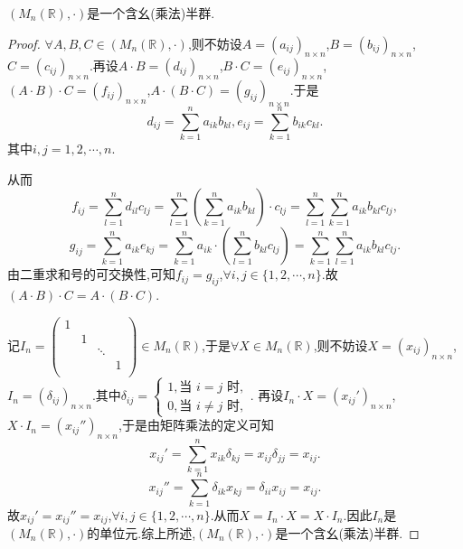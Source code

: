 \documentclass[../../main.tex]{subfiles}
\begin{document}
\begin{example}
$\left( M_n\left( \mathbb{R} \right) ,\cdot \right)$是一个含幺(乘法)半群.
\end{example}
\begin{proof}
\(\forall A,B,C\in (M_n(\mathbb{R}),\cdot)\),则不妨设\(A=(a_{ij})_{n\times n}\),\(B=(b_{ij})_{n\times n}\),\(C=(c_{ij})_{n\times n}\).再设\(A\cdot B=(d_{ij})_{n\times n}\),\(B\cdot C=(e_{ij})_{n\times n}\),\((A\cdot B)\cdot C=(f_{ij})_{n\times n}\),\(A\cdot (B\cdot C)=(g_{ij})_{n\times n}\).于是
\[
d_{ij}=\sum_{k = 1}^n{a_{ik}b_{kl}},e_{ij}=\sum_{k = 1}^n{b_{ik}c_{kl}}.
\]
其中\(i,j = 1,2,\cdots,n\).

从而
\[
f_{ij}=\sum_{l = 1}^n{d_{il}c_{lj}}=\sum_{l = 1}^n{\left(\sum_{k = 1}^n{a_{ik}b_{kl}}\right)\cdot c_{lj}}=\sum_{l = 1}^n{\sum_{k = 1}^n{a_{ik}b_{kl}c_{lj}}},
\]
\[
g_{ij}=\sum_{k = 1}^n{a_{ik}e_{kj}}=\sum_{k = 1}^n{a_{ik}\cdot\left(\sum_{l = 1}^n{b_{kl}c_{lj}}\right)}=\sum_{k = 1}^n{\sum_{l = 1}^n{a_{ik}b_{kl}c_{lj}}}.
\]
由二重求和号的可交换性,可知\(f_{ij}=g_{ij}\),\(\forall i,j\in \{1,2,\cdots,n\}\).故\((A\cdot B)\cdot C = A\cdot (B\cdot C)\).

记\(I_n=\begin{pmatrix}
1 & & & \\
& 1 & & \\
& & \ddots & \\
& & & 1\\
\end{pmatrix}\in M_n(\mathbb{R})\),于是\(\forall X\in M_n(\mathbb{R})\),则不妨设\(X=(x_{ij})_{n\times n}\),\(I_n = (\delta_{ij})_{n\times n}\).其中\(\delta_{ij}=\begin{cases}
1,\text{当 }i = j\text{ 时},\\
0,\text{当 }i\neq j\text{ 时},
\end{cases}\).
再设\(I_n\cdot X=(x_{ij}')_{n\times n}\),\(X\cdot I_n=(x_{ij}'')_{n\times n}\),于是由矩阵乘法的定义可知
\[
x_{ij}'=\sum_{k = 1}^n{x_{ik}\delta_{kj}}=x_{ij}\delta_{jj}=x_{ij}.
\]
\[
x_{ij}''=\sum_{k = 1}^n{\delta_{ik}x_{kj}}=\delta_{ii}x_{ij}=x_{ij}.
\]
故\(x_{ij}'=x_{ij}''=x_{ij}\),\(\forall i,j\in \{1,2,\cdots,n\}\).从而\(X = I_n\cdot X = X\cdot I_n\).因此\(I_n\)是\((M_n(\mathbb{R}),\cdot)\)的单位元.综上所述,$\left( M_n\left( \mathbb{R} \right) ,\cdot \right)$是一个含幺(乘法)半群.

\end{proof}
\end{document}
